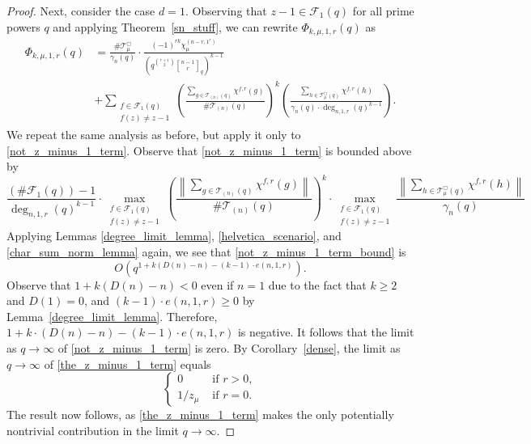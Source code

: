 \documentclass[Unicode,ALCO]{cedram}
\newcommand{\CF}{\mathcal{F}}
\newcommand{\CT}{\mathcal{T}}
\begin{document}
\begin{proof}
Next, consider the case \(d = 1\).
Observing that \(z-1 \in \CF_1 (q)\) for all prime powers \(q\) and applying Theorem~\ref{sn_stuff}, we can rewrite \(\Phi_{k,\mu,1,r} (q)\) as
\begin{align}
\Phi_{k,\mu,1,r} (q)
& =
\frac{\# \CT_\mu^\Box}{\gamma_n (q)}
\cdot
\frac{(-1)^{rk} \chi^{(n-r,1^r)}_\mu}{\left ( q^{\binom{r+1}{2}} {\genfrac[]{0pt}{1}{n - 1}{r}}_{q} \right )^{k-1}}
\label{the_z_minus_1_term}
\\
& + \label{not_z_minus_1_term}
\sum_{\substack{f \in \CF_1 (q) \\ f(z) \neq z-1}}
\left (
\frac{\sum_{g \in \CT_{(n)}(q)} \chi^{f,r}(g)}{\# \CT_{(n)}(q)}
\right )^k
\left (
\frac{\sum_{h \in \CT^\Box_\mu(q)} \chi^{f,r}(h)}{\gamma_n(q) \cdot \deg_{n,1,r}(q)^{k-1}}
\right ).
\end{align}
We repeat the same analysis as before, but apply it only to \eqref{not_z_minus_1_term}.
Observe that \eqref{not_z_minus_1_term} is bounded above by
\begin{equation}
\label{not_z_minus_1_term_bound}
\frac{
(\# \CF_1(q)) - 1
}{
\deg_{n,1,r} (q)^{k-1}
}
\cdot
\max_{\substack{f \in \CF_1 (q) \\ f(z) \neq z-1}}
\left (
\frac{\left \| \sum_{g \in \CT_{(n)}(q)} \chi^{f,r}(g) \right \|}{\# \CT_{(n)}(q)}
\right )^k
\cdot
\max_{\substack{f \in \CF_1 (q) \\ f(z) \neq z-1}}
\frac{\left \| \sum_{h \in \CT^\Box_\mu(q)} \chi^{f,r}(h) \right \|}{\gamma_n(q)}
\end{equation}
Applying Lemmas \ref{degree_limit_lemma}, \ref{helvetica_scenario}, and \ref{char_sum_norm_lemma} again, we see that \eqref{not_z_minus_1_term_bound} is
\begin{equation}
\label{d_1_non_z_minus_1}
O \left (
q^{1 + k (D(n) - n) - (k-1) \cdot e(n,1,r)}
\right ).
\end{equation}
Observe that \(1 + k(D(n) - n) < 0\) even if \(n = 1\) due to the fact that \(k \geq 2\) and \(D(1)=0\), and \((k-1) \cdot e(n,1,r) \geq 0\) by Lemma~\ref{degree_limit_lemma}.
Therefore, \(1 + k \cdot (D(n) - n) - (k-1) \cdot e(n,1,r)\) is negative.
It follows that the limit as \(q \to \infty\) of \eqref{not_z_minus_1_term} is zero.
By Corollary~\ref{dense}, the limit as \(q \to \infty\) of \eqref{the_z_minus_1_term} equals
\begin{equation}
\begin{cases}
0 & \text{ if } r > 0, \\
1/z_\mu & \text{ if } r = 0.
\end{cases}
\end{equation}
The result now follows, as \eqref{the_z_minus_1_term} makes the only potentially nontrivial contribution in the limit \(q \to \infty\).
\end{proof}
\end{document}
